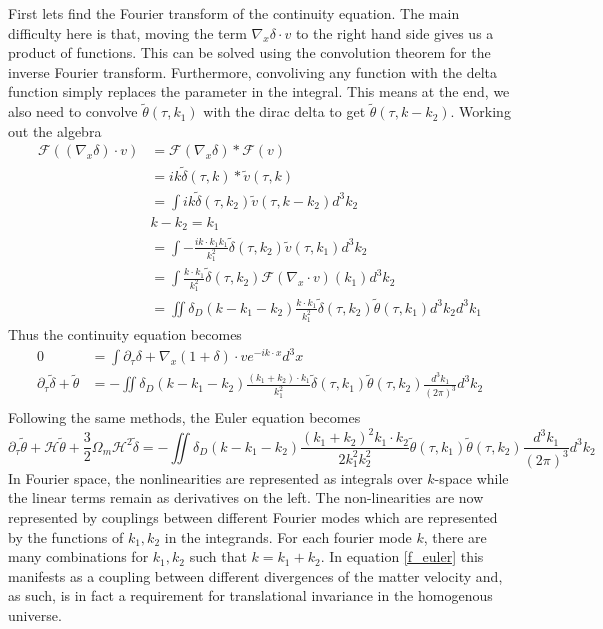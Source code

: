 First lets find the Fourier transform of the continuity equation. The main difficulty here is that, moving the term $\nabla_x\delta\cdot v$ to the right hand side gives us a product of functions. This can be solved using the convolution theorem for the inverse Fourier transform. Furthermore, convoliving any function with the delta function simply replaces the parameter in the integral. This means at the end, we also need to convolve $\tilde\theta(\tau,k_1)$ with the dirac delta to get $\tilde\theta(\tau,k-k_2)$. Working out the algebra
\begin{equation}
	\begin{split}
		\mathcal{F}((\nabla_x\delta)\cdot v ) &= \mathcal{F}(\nabla_x\delta) * \mathcal{F}(v) \\
		&= ik \tilde{\delta}(\tau,k) * \tilde{v}(\tau,k) \\
		&= \int ik \tilde{\delta}(\tau,k_2) \tilde{v}(\tau,k-k_2)d^3k_2 \\
		& k-k_2 = k_1\\
		&= \int -\frac{ik\cdot k_1 k_1}{k_1^2} \tilde\delta (\tau,k_2) \tilde{v}(\tau,k_1) d^3k_2 \\
		&= \int \frac{k\cdot k_1}{k_1^2} \tilde\delta (\tau,k_2) \mathcal{F}(\nabla_x\cdot v)(k_1) d^3k_2 \\
		&= \iint \delta_D(k-k_1-k_2) \frac{k\cdot k_1}{k_1^2} \tilde\delta(\tau,k_2) \tilde\theta(\tau,k_1) d^3k_2 d^3k_1
	\end{split}
\end{equation}
Thus the continuity equation becomes
\begin{equation}\label{f_continuity}
	\begin{split}
		0&=\int \partial_\tau \delta + \nabla_x(1+\delta)\cdot v e^{-ik \cdot x}d^3x \\
		\partial_\tau \tilde\delta + \tilde\theta &= - \iint \delta_D(k-k_1-k_2)\frac{(k_1+k_2)\cdot k_1}{k_1^2} \tilde\delta(\tau,k_1)\tilde\theta(\tau,k_2)\frac{d^3k_1}{(2\pi)^3}d^3k_2 \\
	\end{split}
\end{equation}
Following the same methods, the Euler equation becomes
\begin{equation}\label{f_euler}
	\partial_\tau \tilde\theta + \mathcal{H}\tilde{\theta} + \frac{3}{2}\Omega_m \mathcal{H}^2 \tilde\delta = -\iint \delta_D(k-k_1-k_2) \frac{(k_1+k_2)^2k_1\cdot k_2}{2k_1^2k_2^2} \tilde{\theta}(\tau,k_1)\tilde{\theta}(\tau,k_2)\frac{d^3k_1}{(2\pi)^3}d^3k_2 
\end{equation}
In Fourier space, the nonlinearities are represented as integrals over $k$-space while the linear terms remain as derivatives on the left. The non-linearities are now represented by couplings between different Fourier modes which are represented by the functions of $k_1,k_2$ in the integrands. For each fourier mode $k$, there are many combinations for $k_1,k_2$ such that $k=k_1+k_2$. In equation \ref{f_euler} this manifests as a coupling between different divergences of the matter velocity and, as such, is in fact a requirement for translational invariance in the homogenous universe.
